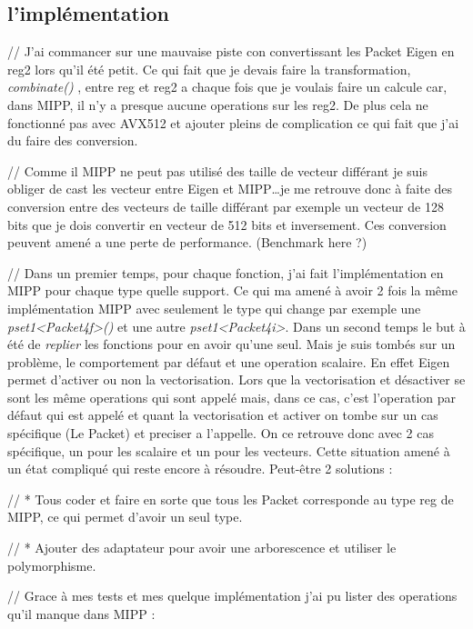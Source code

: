 \subsection{l'implémentation}

// J'ai commancer sur une mauvaise piste con convertissant les Packet Eigen en reg2
lors qu'il été petit. Ce qui fait que je devais faire la transformation, \emph{combinate()}
, entre reg et reg2 a chaque fois que je voulais faire un calcule car, dans MIPP, il
n'y a presque aucune operations sur les reg2. De plus cela ne fonctionné pas avec AVX512
et ajouter pleins de complication ce qui fait que j'ai du faire des conversion.

// Comme il MIPP ne peut pas utilisé des taille de vecteur différant je suis obliger de
cast les vecteur entre Eigen et MIPP\dots je me retrouve donc à faite des conversion
entre des vecteurs de taille différant par exemple un vecteur de 128 bits que je dois
convertir en vecteur de 512 bits et inversement. Ces conversion peuvent amené a une
perte de performance. (Benchmark here ?)

// Dans un premier temps, pour chaque fonction, j'ai fait l'implémentation en MIPP pour
chaque type quelle support. Ce qui ma amené à avoir 2 fois la même implémentation MIPP
avec seulement le type qui change par exemple une \emph{pset1<Packet4f>()} et une autre
\emph{pset1<Packet4i>}. Dans un second temps le but à été de \textit{replier} les
fonctions pour en avoir qu'une seul. Mais je suis tombés sur un problème, le
comportement par défaut et une operation scalaire. En effet Eigen permet d'activer
ou non la vectorisation. Lors que la vectorisation et désactiver se sont les même
operations qui sont appelé mais, dans ce cas, c'est l'operation par défaut qui est
appelé et quant la vectorisation et activer on tombe sur un cas spécifique (Le Packet)
et preciser a l'appelle. On ce retrouve donc avec 2 cas spécifique, un pour les scalaire
et un pour les vecteurs. Cette situation amené à un état compliqué qui reste encore à
résoudre. Peut-être 2 solutions :

// * Tous coder et faire en sorte que tous les Packet corresponde au type reg de MIPP,
ce qui permet d'avoir un seul type.

// * Ajouter des adaptateur pour avoir une arborescence et utiliser le polymorphisme.

// Grace à mes tests et mes quelque implémentation j'ai pu lister des operations qu'il
manque dans MIPP :


